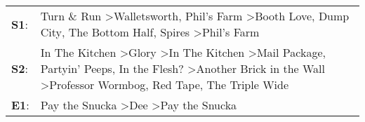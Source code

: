 \begin{supertabular}{p{0.03\textwidth}p{0.92\textwidth}}
 \textbf{S1}:  &                                                                                                                                        Turn \& Run\textsuperscript{} \textgreater \enspace Walletsworth\textsuperscript{}, \enspace Phil's Farm\textsuperscript{} \textgreater \enspace Booth Love\textsuperscript{}, \enspace Dump City\textsuperscript{}, \enspace The Bottom Half\textsuperscript{}, \enspace Spires\textsuperscript{} \textgreater \enspace Phil's Farm\textsuperscript{}  \enspace  \\
 \textbf{S2}:  &  In The Kitchen\textsuperscript{} \textgreater \enspace Glory\textsuperscript{} \textgreater \enspace In The Kitchen\textsuperscript{} \textgreater \enspace Mail Package\textsuperscript{}, \enspace Partyin' Peeps\textsuperscript{}, \enspace In the Flesh?\textsuperscript{} \textgreater \enspace Another Brick in the Wall\textsuperscript{} \textgreater \enspace Professor Wormbog\textsuperscript{}, \enspace Red Tape\textsuperscript{}, \enspace The Triple Wide\textsuperscript{}  \enspace  \\
 \textbf{E1}:  &                                                                                                                                                                                                                                                                                                                                                           Pay the Snucka\textsuperscript{} \textgreater \enspace Dee\textsuperscript{} \textgreater \enspace Pay the Snucka\textsuperscript{}  \enspace  \\
\end{supertabular}
